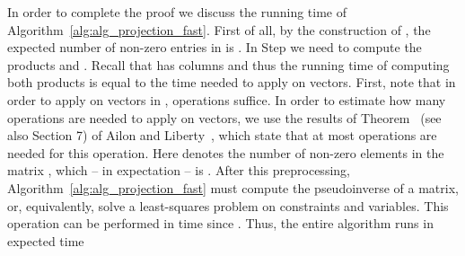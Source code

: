 \documentclass[11pt]{article}
\begin{document}
In order to complete the proof we discuss the running time of Algorithm~\ref{alg:alg_projection_fast}. First of all, by the construction of , the expected number of non-zero entries in  is . In Step  we need to compute the products  and . Recall that  has  columns and thus the running time of computing both products is equal to the time needed to apply  on  vectors. First, note that in order to apply  on  vectors in ,  operations suffice. In order to estimate how many operations are needed to apply  on  vectors, we use the results of Theorem~ (see also Section 7) of Ailon and Liberty~\cite{AL08}, which state that at most  operations are needed for this operation. Here  denotes the number of non-zero elements in the matrix , which -- in expectation -- is . After this preprocessing, Algorithm~\ref{alg:alg_projection_fast} must compute the pseudoinverse of a  matrix, or, equivalently, solve a least-squares problem on  constraints and  variables. This operation can be performed in  time since . Thus, the entire algorithm runs in expected time
\end{document}

